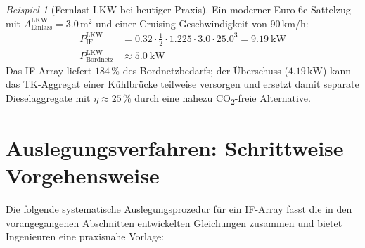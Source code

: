 ﻿\documentclass[12pt, a4paper]{report}
\theoremstyle{definition}
\theoremstyle{remark}
\newtheorem{beispiel}[theorem]{Beispiel}
\newcommand{\Aeinlass}{A_{\text{Einlass}}}
\begin{document}
\begin{beispiel}[Fernlast-LKW bei heutiger Praxis]
  Ein moderner Euro-6e-Sattelzug mit $\Aeinlass^{\text{LKW}} = 3.0\,\text{m}^2$
  und einer Cruising-Geschwindigkeit von 90\,km/h:
  \begin{align}
    P_{\text{IF}}^{\text{LKW}} &= 0.32 \cdot \tfrac{1}{2} \cdot 1.225 \cdot 3.0
    \cdot 25.0^3 = \SI{9.19}{\kilo\watt} \\
    P_{\text{Bordnetz}}^{\text{LKW}} &\approx \SI{5.0}{\kilo\watt}
  \end{align}
  Das IF-Array liefert $184\,\%$ des Bordnetzbedarfs; der Überschuss
  ($4.19\,\text{kW}$) kann das TK-Aggregat einer Kühlbrücke teilweise
  versorgen und ersetzt damit separate Dieselaggregate mit $\eta \approx 25\,\%$
  durch eine nahezu CO\textsubscript{2}-freie Alternative.
\end{beispiel}

\section{Auslegungsverfahren: Schrittweise Vorgehensweise}
\label{sec:kfz_auslegung}

Die folgende systematische Auslegungsprozedur für ein IF-Array fasst
die in den vorangegangenen Abschnitten entwickelten Gleichungen zusammen
und bietet Ingenieuren eine praxisnahe Vorlage:
\end{document}
